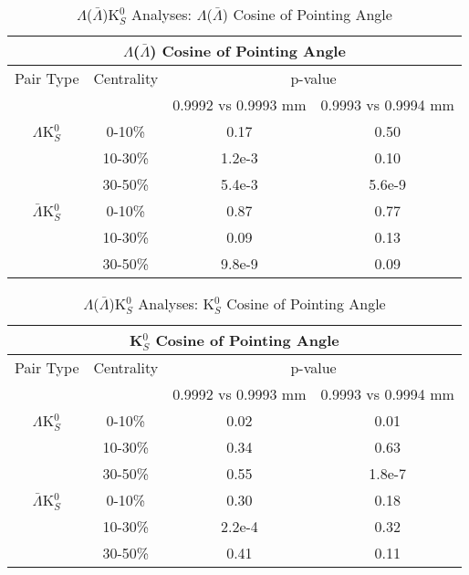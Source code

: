 \documentclass[../AnalysisNoteJBuxton.tex]{subfiles}
\begin{document}
\begin{table}
 \centering
 \begin{tabular}{|c|c|c|c|}
 \multicolumn{4}{c}{$\Lambda$($\bar{\Lambda}$) Cosine of Pointing Angle} \\
  \hline
  Pair Type & Centrality & \multicolumn{2}{c|}{p-value} \\
  \cline{3-4}
   & & 0.9992 vs 0.9993 mm & 0.9993 vs 0.9994 mm \\
  \hline
  $\Lambda$K$^{0}_{S}$ & 0-10\% & 0.17 & 0.50 \\
   & 10-30\% & 1.2e-3 & 0.10 \\
   & 30-50\% & 5.4e-3 & 5.6e-9 \\
  \hline
  $\bar{\Lambda}$K$^{0}_{S}$ & 0-10\% & 0.87 & 0.77 \\
   & 10-30\% & 0.09 & 0.13 \\
   & 30-50\% & 9.8e-9 & 0.09 \\
  \hline
 \end{tabular}
 \caption{$\Lambda$($\bar{\Lambda}$)K$^{0}_{S}$ Analyses: $\Lambda$($\bar{\Lambda}$) Cosine of Pointing Angle}
 \label{tab:LamCosPointingAngleLamK0}
\end{table}

\begin{table}
 \centering
 \begin{tabular}{|c|c|c|c|}
 \multicolumn{4}{c}{K$^{0}_{S}$ Cosine of Pointing Angle} \\
  \hline
  Pair Type & Centrality & \multicolumn{2}{c|}{p-value} \\
  \cline{3-4}
   & & 0.9992 vs 0.9993 mm & 0.9993 vs 0.9994 mm \\
  \hline
  $\Lambda$K$^{0}_{S}$ & 0-10\% & 0.02 & 0.01 \\
   & 10-30\% & 0.34 & 0.63 \\
   & 30-50\% & 0.55 & 1.8e-7 \\
  \hline
  $\bar{\Lambda}$K$^{0}_{S}$ & 0-10\% & 0.30 & 0.18 \\
   & 10-30\% & 2.2e-4 & 0.32 \\
   & 30-50\% & 0.41 & 0.11 \\
  \hline
 \end{tabular}
 \caption{$\Lambda$($\bar{\Lambda}$)K$^{0}_{S}$ Analyses: K$^{0}_{S}$ Cosine of Pointing Angle}
 \label{tab:K0CosPointingAngleLamK0}
\end{table}
\end{document}

